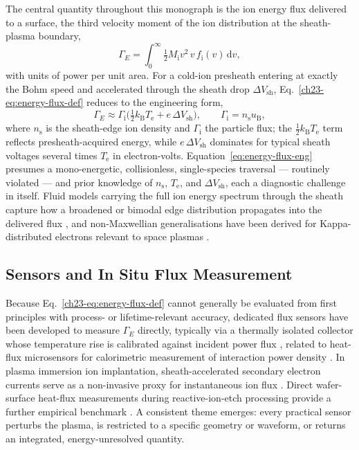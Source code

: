 The central quantity throughout this monograph is the ion energy flux delivered to a surface, the third velocity moment of the ion distribution at the sheath-plasma boundary,
\begin{equation}
\Gamma_{E} = \int_{0}^{\infty} \tfrac{1}{2} M_{\mathrm{i}} v^{2}\, v\, f_{\mathrm{i}}(v)\,\mathrm{d}v ,
\label{ch23-eq:energy-flux-def}
\end{equation}
with units of power per unit area. For a cold-ion presheath entering at exactly the Bohm speed and accelerated through the sheath drop $\Delta V_{\mathrm{sh}}$, Eq.~\eqref{ch23-eq:energy-flux-def} reduces to the engineering form,
\begin{equation}
\Gamma_{E} \approx \Gamma_{\mathrm{i}}\Big(\tfrac{1}{2}k_{\mathrm{B}}T_{\mathrm{e}} + e\,\Delta V_{\mathrm{sh}}\Big), \qquad \Gamma_{\mathrm{i}} = n_{\mathrm{s}} u_{\mathrm{B}},
\label{eq:energy-flux-eng}
\end{equation}
where $n_{\mathrm{s}}$ is the sheath-edge ion density and $\Gamma_{\mathrm{i}}$ the particle flux; the $\tfrac{1}{2}k_{\mathrm{B}}T_{\mathrm{e}}$ term reflects presheath-acquired energy, while $e\,\Delta V_{\mathrm{sh}}$ dominates for typical sheath voltages several times $T_{\mathrm{e}}$ in electron-volts. Equation~\eqref{eq:energy-flux-eng} presumes a mono-energetic, collisionless, single-species traversal — routinely violated — and prior knowledge of $n_{\mathrm{s}}$, $T_{\mathrm{e}}$, and $\Delta V_{\mathrm{sh}}$, each a diagnostic challenge in itself. Fluid models carrying the full ion energy spectrum through the sheath capture how a broadened or bimodal edge distribution propagates into the delivered flux \cite{ref0083}, and non-Maxwellian generalisations have been derived for Kappa-distributed electrons relevant to space plasmas \cite{ref0090}.

\subsection{Sensors and In Situ Flux Measurement}

Because Eq.~\eqref{ch23-eq:energy-flux-def} cannot generally be evaluated from first principles with process- or lifetime-relevant accuracy, dedicated flux sensors have been developed to measure $\Gamma_{E}$ directly, typically via a thermally isolated collector whose temperature rise is calibrated against incident power flux \cite{ref0075}, related to heat-flux microsensors for calorimetric measurement of interaction power density \cite{ref0175}. In plasma immersion ion implantation, sheath-accelerated secondary electron currents serve as a non-invasive proxy for instantaneous ion flux \cite{ref0078}. Direct wafer-surface heat-flux measurements during reactive-ion-etch processing provide a further empirical benchmark \cite{ref0080}. A consistent theme emerges: every practical sensor perturbs the plasma, is restricted to a specific geometry or waveform, or returns an integrated, energy-unresolved quantity.

